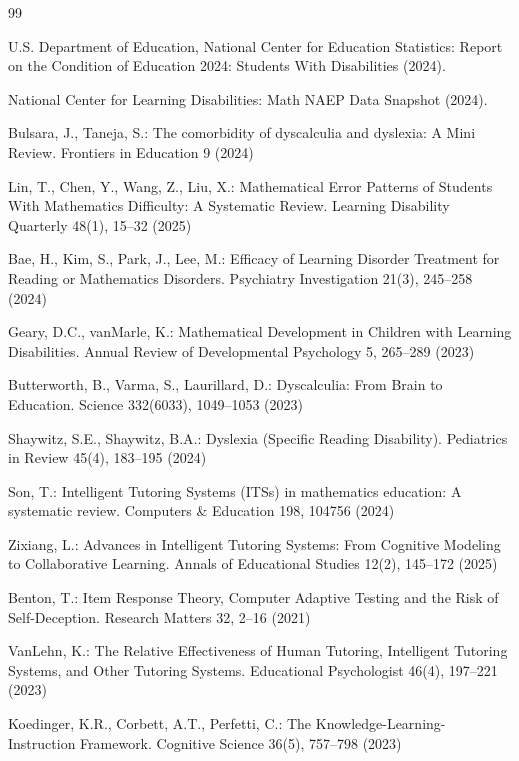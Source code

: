 \documentclass[11pt]{article}
\begin{document}

\begin{thebibliography}{99}

U.S. Department of Education, National Center for Education Statistics: Report on the Condition of Education 2024: Students With Disabilities (2024).

National Center for Learning Disabilities: Math NAEP Data Snapshot (2024).

Bulsara, J., Taneja, S.: The comorbidity of dyscalculia and dyslexia: A Mini Review. Frontiers in Education 9 (2024)

Lin, T., Chen, Y., Wang, Z., Liu, X.: Mathematical Error Patterns of Students With Mathematics Difficulty: A Systematic Review. Learning Disability Quarterly 48(1), 15--32 (2025)

Bae, H., Kim, S., Park, J., Lee, M.: Efficacy of Learning Disorder Treatment for Reading or Mathematics Disorders. Psychiatry Investigation 21(3), 245--258 (2024)

Geary, D.C., vanMarle, K.: Mathematical Development in Children with Learning Disabilities. Annual Review of Developmental Psychology 5, 265--289 (2023)

Butterworth, B., Varma, S., Laurillard, D.: Dyscalculia: From Brain to Education. Science 332(6033), 1049--1053 (2023)

Shaywitz, S.E., Shaywitz, B.A.: Dyslexia (Specific Reading Disability). Pediatrics in Review 45(4), 183--195 (2024)

Son, T.: Intelligent Tutoring Systems (ITSs) in mathematics education: A systematic review. Computers \& Education 198, 104756 (2024)

Zixiang, L.: Advances in Intelligent Tutoring Systems: From Cognitive Modeling to Collaborative Learning. Annals of Educational Studies 12(2), 145--172 (2025)

Benton, T.: Item Response Theory, Computer Adaptive Testing and the Risk of Self-Deception. Research Matters 32, 2--16 (2021)

VanLehn, K.: The Relative Effectiveness of Human Tutoring, Intelligent Tutoring Systems, and Other Tutoring Systems. Educational Psychologist 46(4), 197--221 (2023)

Koedinger, K.R., Corbett, A.T., Perfetti, C.: The Knowledge-Learning-Instruction Framework. Cognitive Science 36(5), 757--798 (2023)


\end{thebibliography}
\end{document}

